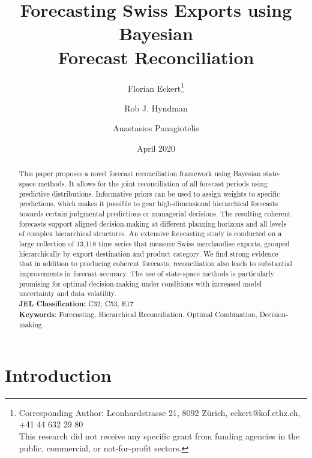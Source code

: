\documentclass[a4paper,fleqn,11pt]{article}
\begin{document}
\title{\huge Forecasting Swiss Exports using Bayesian \\Forecast Reconciliation}

\author[$\dagger$]{Florian Eckert\thanks{Corresponding Author: Leonhardstrasse 21, 8092 Zürich, eckert@kof.ethz.ch, +41 44 632 29 80\\This research did not receive any specific grant from funding agencies in the public, commercial, or not-for-profit sectors.}}
\author[$\ddagger$]{Rob J. Hyndman}
\author[$\ddagger$]{Anastasios Panagiotelis}
\date{April 2020}

\clearpage\maketitle
\thispagestyle{empty}

\begin{abstract}
	\noindent This paper proposes a novel forecast reconciliation framework using Bayesian state-space methods. It allows for the joint reconciliation of all forecast periods using predictive distributions. Informative priors can be used to assign weights to specific predictions, which makes it possible to gear high-dimensional hierarchical forecasts towards certain judgmental predictions or managerial decisions. The resulting coherent forecasts support aligned decision-making at different planning horizons and all levels of complex hierarchical structures. An extensive forecasting study is conducted on a large collection of 13,118 time series that measure Swiss merchandise exports, grouped hierarchically by export destination and product category. We find strong evidence that in addition to producing coherent forecasts, reconciliation also leads to substantial improvements in forecast accuracy. The use of state-space methods is particularly promising for optimal decision-making under conditions with increased model uncertainty and data volatility. \\
	
	\noindent \textbf{JEL Classification:} C32, C53, E17\\
	\noindent \textbf{Keywords}: Forecasting, Hierarchical Reconciliation, Optimal Combination, Decision-making.
\end{abstract}
\clearpage
\setcounter{page}{1}

\section{Introduction}\label{sec:intro}
\end{document}
